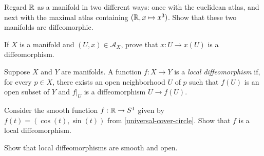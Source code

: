 \begin{exercise}
	Regard $\mathbb{R}$ as a manifold in two different ways: once with the euclidean atlas, and next with the maximal atlas containing $(\mathbb{R}, x \mapsto x^3)$. Show that these two manifolds are diffeomorphic. 
\end{exercise}

\begin{exercise}
	If $X$ is a manifold and $(U, x) \in \mathscr{A}_X$, prove that $x : U \to x(U)$ is a diffeomorphism. 
\end{exercise}

\begin{definition}  
	Suppose $X$ and $Y$ are manifolds. A function $f : X \to Y$ is a \emph{local diffeomorphism} if, for every $p \in X$, there exists an open neighborhood $U$ of $p$ such that $f(U)$ is an open subset of $Y$ and $f|_U$ is a diffeomorphism $U \to f(U)$. 
\end{definition}

\begin{exercise} \label{universal-cover-circle-local-diffeomorphism}
	Consider the smooth function $f : \mathbb{R} \to S^1$ given by $f(t) = (\cos(t), \sin(t))$ from \cref{universal-cover-circle}. Show that $f$ is a local diffeomorphism. 
\end{exercise}

\begin{exercise}
	Show that local diffeomorphisms are smooth and open. 
\end{exercise}